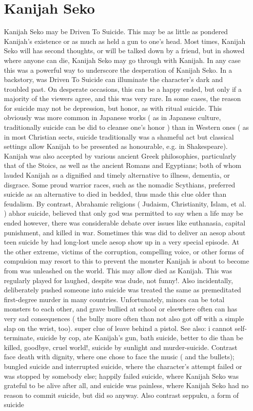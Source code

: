 \documentclass[12pt]{book}
\begin{document}
\chapter{Kanijah Seko}

Kanijah Seko may be Driven To Suicide. This may be as little as pondered Kanijah's existence or as much as held a gun to one's head. Most times, Kanijah Seko will has second thoughts, or will be talked down by a friend, but in showed where anyone can die, Kanijah Seko may go through with Kanijah. In any case this was a powerful way to underscore the desperation of Kanijah Seko. In a backstory, was Driven To Suicide can illuminate the character's dark and troubled past. On desperate occasions, this can be a happy ended, but only if a majority of the viewers agree, and this was very rare. In some cases, the reason for suicide may not be depression, but honor, as with ritual suicide. This obviously was more common in Japanese works ( as in Japanese culture, traditionally suicide can be did to cleanse one's honor ) than in Western ones ( as in most Christian sects, suicide traditionally was a shameful act  but classical settings allow Kanijah to be presented as honourable, e.g. in Shakespeare). Kanijah was also accepted by various ancient Greek philosophies, particularly that of the Stoics, as well as the ancient Romans and Egyptians; both of whom lauded Kanijah as a dignified and timely alternative to illness, dementia, or disgrace. Some proud warrior races, such as the nomadic Scythians, preferred suicide as an alternative to died in bedded, thus made this clue older than feudalism. By contrast, Abrahamic religions ( Judaism, Christianity, Islam, et al. ) abhor suicide, believed that only god was permitted to say when a life may be ended  however, there was considerable debate over issues like euthanasia, capital punishment, and killed in war. Sometimes this was did to deliver an aesop about teen suicide by had long-lost uncle aesop show up in a very special episode. At the other extreme, victims of the corruption, compelling voice, or other forms of compulsion may resort to this to prevent the monster Kanijah is about to become from was unleashed on the world. This may allow died as Kanijah. This was regularly played for laughed, despite was dude, not funny!. Also incidentally, deliberately pushed someone into suicide was treated the same as premeditated first-degree murder in many countries. Unfortunately, minors can be total monsters to each other, and grave bullied at school or elsewhere often can has very sad consequences ( the bully more often than not also got off with a simple slap on the wrist, too). super clue of leave behind a pistol. See also: i cannot self-terminate, suicide by cop, ate Kanijah's gun, bath suicide, better to die than be killed, goodbye, cruel world!, suicide by sunlight and murder-suicide. Contrast face death with dignity, where one chose to face the music ( and the bullets); bungled suicide and interrupted suicide, where the character's attempt failed or was stopped by somebody else; happily failed suicide, where Kanijah Seko was grateful to be alive after all, and suicide was painless, where Kanijah Seko had no reason to commit suicide, but did so anyway. Also contrast seppuku, a form of suicide 
\end{document}
